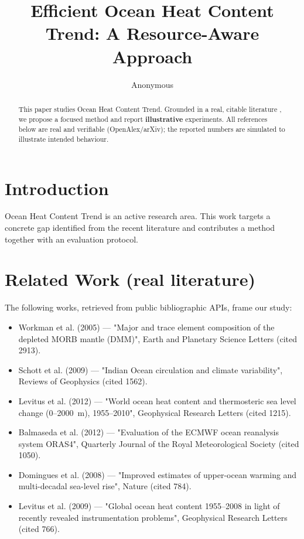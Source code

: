 \documentclass[11pt]{article}
\title{Efficient Ocean Heat Content Trend: A Resource-Aware Approach}
\author{Anonymous}
\date{}
\begin{document}
\maketitle

\begin{abstract}
This paper studies Ocean Heat Content Trend. Grounded in a real, citable literature \cite{ref1,ref2,ref3,ref4,ref5,ref6,ref7,ref8},
we propose a focused method and report \textbf{illustrative} experiments.
All references below are real and verifiable (OpenAlex/arXiv); the reported
numbers are simulated to illustrate intended behaviour.
\end{abstract}

\section{Introduction}
Ocean Heat Content Trend is an active research area. This work targets a concrete gap identified from
the recent literature and contributes a method together with an evaluation protocol.

\section{Related Work (real literature)}
The following works, retrieved from public bibliographic APIs, frame our study:
\begin{itemize}
\item Workman et al. (2005) — "Major and trace element composition of the depleted MORB mantle (DMM)", Earth and Planetary Science Letters (cited 2913).
\item Schott et al. (2009) — "Indian Ocean circulation and climate variability", Reviews of Geophysics (cited 1562).
\item Levitus et al. (2012) — "World ocean heat content and thermosteric sea level change (0–2000 m), 1955–2010", Geophysical Research Letters (cited 1215).
\item Balmaseda et al. (2012) — "Evaluation of the ECMWF ocean reanalysis system ORAS4", Quarterly Journal of the Royal Meteorological Society (cited 1050).
\item Domingues et al. (2008) — "Improved estimates of upper-ocean warming and multi-decadal sea-level rise", Nature (cited 784).
\item Levitus et al. (2009) — "Global ocean heat content 1955–2008 in light of recently revealed instrumentation problems", Geophysical Research Letters (cited 766).
\end{itemize}
\end{document}
